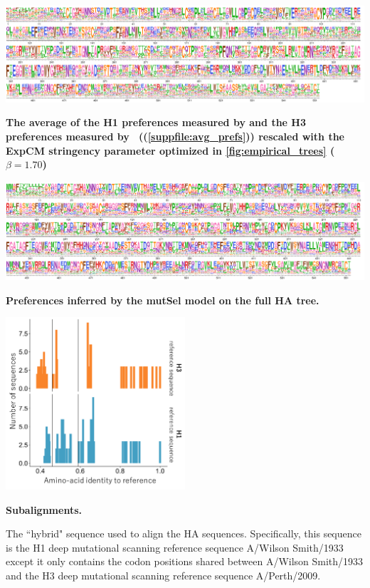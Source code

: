 \documentclass[11pt]{article}
\begin{document}
\begin{suppfig}[H]
\centerline{\includegraphics[width=\textwidth]{figures/prefs_average}}
\caption{\label{suppfig:prefs_average}
\textbf{The average of the H1 preferences measured by \cite{doud2016accurate} and the H3 preferences measured by~\citet{lee2018deep} ((\ref{suppfile:avg_prefs})) rescaled with the ExpCM stringency parameter optimized in \ref{fig:empirical_trees}  ($\beta = 1.70$)}}
\end{suppfig}

\begin{suppfig}[H]
\centerline{\includegraphics[width=\textwidth]{figures/prefs_mutSel}}
\caption{\label{suppfig:prefs_mutSel}
\textbf{Preferences inferred by the mutSel model on the full HA tree.}
}
\end{suppfig}

\begin{suppfig}[H]
\centerline{\includegraphics[width=0.50\textwidth]{figures/divergence_distances.pdf}}
\caption{\label{suppfig:subalignments}
\textbf{Subalignments.}
}
\end{suppfig}

\begin{suppfile}
\caption{
\label{suppfile:hybrid_sequence}
The ``hybrid" sequence used to align the HA sequences.
Specifically, this sequence is the H1 deep mutational scanning reference sequence A/Wilson Smith/1933 except it only contains the codon positions shared between A/Wilson Smith/1933 and the H3 deep mutational scanning reference sequence A/Perth/2009. 
}
\end{suppfile}
\end{document}
